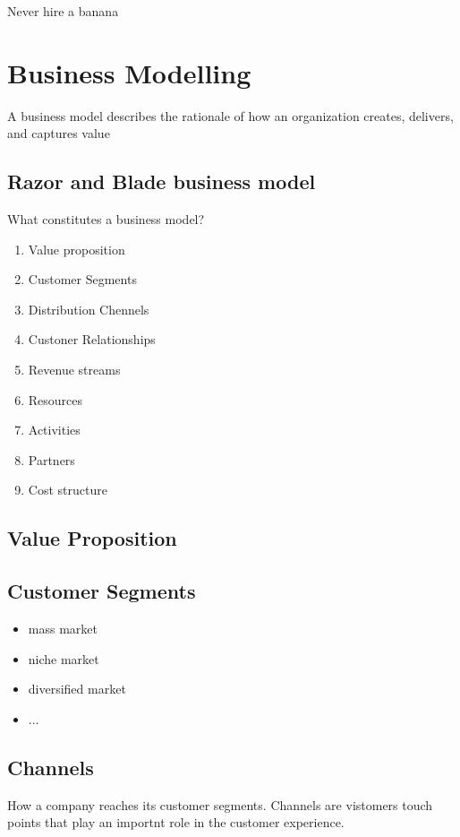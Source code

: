 \documentclass{article}
\begin{document}
\begin{warning}{Never hire a banana}
\end{warning}

\section{Business Modelling}
A business model describes the rationale of how an organization creates, delivers, and captures value
\subsection{Razor and Blade business model}

What constitutes a business model?
\begin{enumerate}
    \item Value proposition
    \item Customer Segments
    \item Distribution Chennels
    \item Custoner Relationships
    \item Revenue streams
    \item Resources
    \item Activities
    \item Partners
    \item Cost structure
\end{enumerate}

\subsection{Value Proposition}
\subsection{Customer Segments}
\begin{itemize}
    \item mass market
    \item niche market
    \item diversified market
    \item ...
\end{itemize}

\subsection{Channels}
How a company reaches its customer segments.
Channels are vistomers touch points that play an importnt role in the customer experience.
\end{document}
